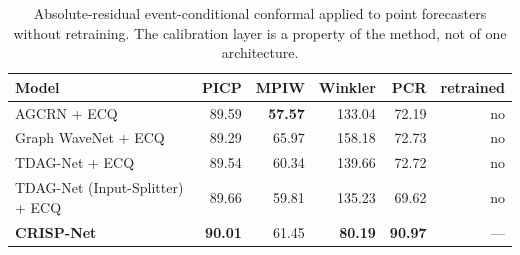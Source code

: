 \begin{table}[!t]
\caption{Absolute-residual event-conditional conformal applied to point forecasters without retraining. The calibration layer is a property of the method, not of one architecture.}
\label{tab:transfer}
\centering
\footnotesize
\begin{tabular}{lrrrrr}
\toprule
Model & PICP & MPIW & Winkler & PCR & retrained \\
\midrule
AGCRN + ECQ & 89.59 & \textbf{57.57} & 133.04 & 72.19 & no \\
Graph WaveNet + ECQ & 89.29 & 65.97 & 158.18 & 72.73 & no \\
TDAG-Net + ECQ & 89.54 & 60.34 & 139.66 & 72.72 & no \\
TDAG-Net (Input-Splitter) + ECQ & 89.66 & 59.81 & 135.23 & 69.62 & no \\
\textbf{CRISP-Net} & \textbf{90.01} & 61.45 & \textbf{80.19} & \textbf{90.97} & — \\
\bottomrule
\end{tabular}
\end{table}
